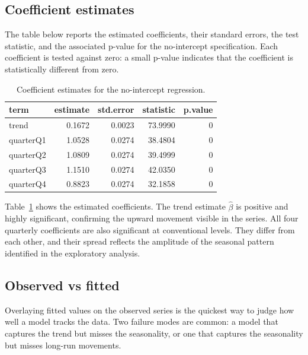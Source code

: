 \documentclass[
  english,
  a4paper,
]{article}
\begin{document}
\subsection{Coefficient estimates}\label{coefficient-estimates}

The table below reports the estimated coefficients, their standard
errors, the test statistic, and the associated p-value for the
no-intercept specification. Each coefficient is tested against zero: a
small p-value indicates that the coefficient is statistically different
from zero.

{

\begin{longtable}[]{@{}lrrrr@{}}

\caption{\label{tbl-coef}Coefficient estimates for the no-intercept
regression.}

\tabularnewline

\toprule\noalign{}
term & estimate & std.error & statistic & p.value \\
\midrule\noalign{}
\endhead
\bottomrule\noalign{}
\endlastfoot
trend & 0.1672 & 0.0023 & 73.9990 & 0 \\
quarterQ1 & 1.0528 & 0.0274 & 38.4804 & 0 \\
quarterQ2 & 1.0809 & 0.0274 & 39.4999 & 0 \\
quarterQ3 & 1.1510 & 0.0274 & 42.0350 & 0 \\
quarterQ4 & 0.8823 & 0.0274 & 32.1858 & 0 \\

\end{longtable}

}

Table~\ref{tbl-coef} shows the estimated coefficients. The trend
estimate \(\hat{\beta}\) is positive and highly significant, confirming
the upward movement visible in the series. All four quarterly
coefficients are also significant at conventional levels. They differ
from each other, and their spread reflects the amplitude of the seasonal
pattern identified in the exploratory analysis.

\subsection{Observed vs fitted}\label{observed-vs-fitted}

Overlaying fitted values on the observed series is the quickest way to
judge how well a model tracks the data. Two failure modes are common: a
model that captures the trend but misses the seasonality, or one that
captures the seasonality but misses long-run movements.
\end{document}

